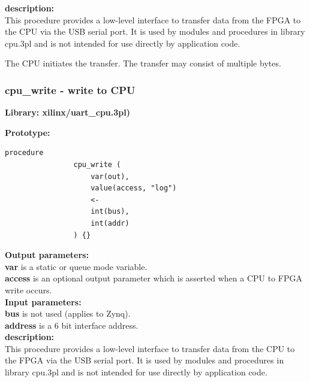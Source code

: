             {\bf description:} \\
            This procedure provides a low-level interface to transfer
            data from the FPGA to the CPU via the USB serial port. It is
            used by modules and procedures in library cpu.3pl and is not
            intended for use directly by application code.
            
            The CPU initiates the transfer. The transfer may consist of
            multiple bytes.


        \subsubsection{cpu\_write - write to CPU}\label{sec:lpuartcpuwr}

            {\bf Library: xilinx/uart\_cpu.3pl)}

            {\bf Prototype:} \\
            \vsp
            \begin{lstlisting}[gobble=12, language=threepl]
                procedure
                cpu_write (
                    var(out),
                    value(access, "log")
                    <-
                    int(bus),
                    int(addr)
                ) {}
            \end{lstlisting}
            
            {\bf Output parameters:} \\
            {\bf var} is a static or queue mode variable.\\          
            {\bf access} is an optional output parameter which is asserted
            when a CPU to FPGA write occurs.\\
                       
            {\bf Input parameters:} \\
            {\bf bus} is not used (applies to Zynq).\\
            {\bf address} is a 6 bit interface address.\\           
                     
            {\bf description:} \\
            This procedure provides a low-level interface to transfer
            data from the CPU to the FPGA via the USB serial port. It is
            used by modules and procedures in library cpu.3pl and is not
            intended for use directly by application code.
            
